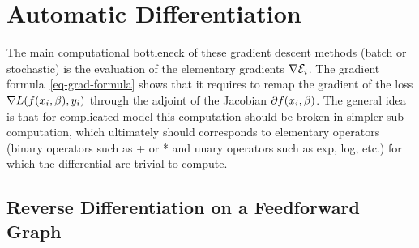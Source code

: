 
\section{Automatic Differentiation}

The main computational bottleneck of these gradient descent methods (batch or stochastic) is the evaluation of the elementary gradients $\nabla \mathcal{E}_i$. The gradient formula~\eqref{eq-grad-formula} shows that it requires to remap the gradient of the loss $\nabla L( f(x_i,\beta),y_i )$ through the adjoint of the Jacobian $\partial f(x_i,\beta)$. 
%
The general idea is that for complicated model this computation should be broken in simpler sub-computation, which ultimately should corresponds to elementary operators (binary operators such as + or * and unary operators such as exp, log, etc.) for which the differential are trivial to compute.

\subsection{Reverse Differentiation on a Feedforward Graph}
\label{sec-reversemode-simple}

